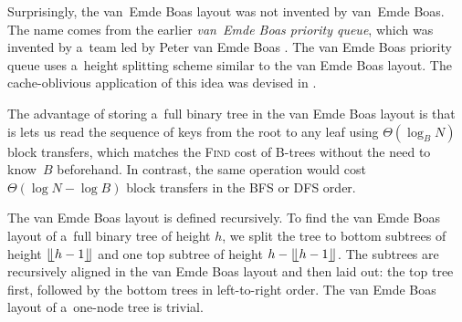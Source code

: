 Surprisingly, the van~Emde Boas layout was not invented by van~Emde Boas.
The name comes from the earlier \emph{van~Emde Boas priority queue},
which was invented by a~team led by Peter van Emde Boas \cite{van-emde-boas}.
The van Emde Boas priority queue uses a~height splitting scheme similar
to the van Emde Boas layout. The cache-oblivious application of this idea
was devised in \cite{veb-layout}.

The advantage of storing a~full binary tree in the van Emde Boas layout
is that is lets us read the sequence of keys from the root to any leaf
using $\Theta(\log_B N)$ block transfers, which matches the \textsc{Find}
cost of \mbox{B-trees} without the need to know~$B$ beforehand.
In contrast, the same operation would cost $\Theta(\log N-\log B)$ block
transfers in the BFS or DFS order.

The van Emde Boas layout is defined recursively. To find the van Emde Boas layout
of a~full binary tree of height $h$, we split the tree to bottom subtrees
of height $\lfloor \kern -0.22em \lfloor h-1 \rfloor \kern -0.22em \rfloor$ and one top subtree of height $h - \lfloor \kern -0.22em \lfloor
h-1 \rfloor \kern -0.22em \rfloor$.
The subtrees are recursively aligned in the van Emde Boas layout and then laid
out: the top tree first, followed by the bottom trees in left-to-right order.
The van Emde Boas layout of a~one-node tree is trivial.

